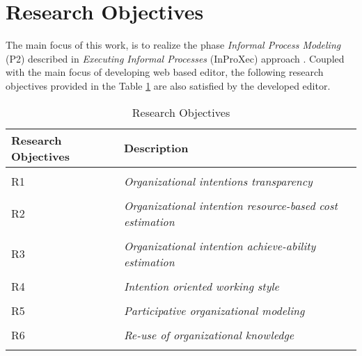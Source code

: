 \section {Research Objectives}
\label{sec:researchobjectives}
The main focus of this work, is to realize the phase \textit{Informal Process Modeling} (P2) described in \textit{Executing Informal Processes} (InProXec) approach \cite{Sungur2015}. Coupled with the main focus of developing web based editor, the following research objectives provided in the Table \ref{tab:researchobjectives} are also satisfied by the developed editor. 

\label{sec:researchobj}
\begin{center}
	\begin{longtable}{p{5cm}p{11cm}} 
   	\toprule 
	\textbf{Research Objectives} & \textbf{Description} \\
	\midrule
	\endfirsthead
	\\
	R1 & \textit{Organizational intentions transparency}  \label{ro1} \\
	\\[-1.5ex]
	R2 & \textit{Organizational intention resource-based cost estimation}  \label{ro2} \\
	\\[-1.5ex]
	R3 & \textit{Organizational intention achieve-ability estimation} \label{ro3}\\
	\\[-1.5ex]
	R4 & \textit{Intention oriented working style}  \label{ro4}\\
	\\[-1.5ex]
	R5 & \textit{Participative organizational modeling}\label{ro5}\\
	\\[-1.5ex]
	R6 & \textit{Re-use of organizational knowledge} \label{ro6}\\	
	\bottomrule
	\caption{Research Objectives}
	\label{tab:researchobjectives}
	\end{longtable}	
\end{center}


